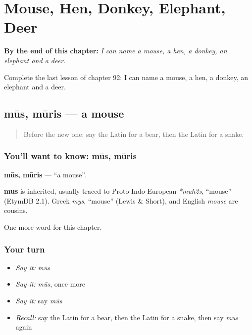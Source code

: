 
\chapter{Mouse, Hen, Donkey, Elephant, Deer}
\label{ch:la-mouse-hen-donkey-elephant-deer}

\begin{chapteropening}
\textbf{By the end of this chapter:} \emph{I can name a mouse, a hen, a donkey, an elephant and a deer.}

Complete the last lesson of chapter 92: I can name a mouse, a hen, a donkey, an elephant and a deer.
\end{chapteropening}

\section[mūs, mūris]{mūs, mūris — a mouse}

\label{lesson:LA-C92-mus}



\begin{quote}
Before the new one: say the Latin for a bear, then the Latin for a snake.
\end{quote}

\subsection*{You'll want to know: mūs, mūris}
\textbf{mūs, mūris} — \textquotedblleft{}a mouse\textquotedblright{}.

\begin{cousinweb}
\textbf{mūs} is inherited, usually traced to Proto-Indo-European \emph{*muh2s}, \textquotedblleft{}mouse\textquotedblright{} (EtymDB 2.1). Greek \emph{mys}, \textquotedblleft{}mouse\textquotedblright{} (Lewis \& Short), and English \emph{mouse} are cousins.
\end{cousinweb}

\begin{grammarlens}[title={What you've built}]
One more word for this chapter.
\end{grammarlens}

\subsection*{Your turn}
\begin{itemize}
\raggedright
  \item \emph{Say it:} \emph{mūs}
  \item \emph{Say it:} \emph{mūs}, once more
  \item \emph{Say it:} say \emph{mūs}
  \item \emph{Recall:} say the Latin for a bear, then the Latin for a snake, then say \emph{mūs} again
\end{itemize}

